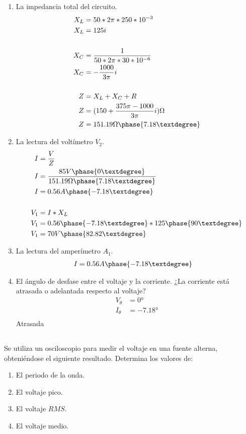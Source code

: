 \documentclass[../main.tex]{subfiles}
\begin{document}
\begin{enumerate}[label=\alph*)]
	\item La impedancia total del circuito.
		\begin{align*}
			X_L &= 50*2\pi*250*10^{-3}\\
			X_L &= 125i\\
			\\
			X_C &= \frac{1}{50*2\pi*30*10^{-6}}\\
			X_C &= -\frac{1000}{3\pi}i\\
			\\
			Z &= X_L+X_C+R\\
			Z &= (150 +\frac{375\pi-1000}{3\pi} i)\Omega\\
			Z &= 151.19\Omega\phase{7.18°}
		\end{align*}
	\item La lectura del voltímetro $V_2$.
		\begin{align*}
			I &= \frac{V}{Z}\\
			I &= \frac{85V\phase{0°}}{151.19\Omega\phase{7.18°}}\\
			I &= 0.56A\phase{-7.18°}\\
			\\
			V_1 &= I*X_L\\
			V_1 &= 0.56\phase{-7.18°}*125\phase{90°}\\
			V_1 &= 70V\phase{82.82°}
		\end{align*}
	\item La lectura del amperímetro $A_1$.
		\begin{align*}
			I &= 0.56A\phase{-7.18°}
		\end{align*}
	\item El ángulo de desfase entre el voltaje y la corriente.
		¿La corriente está atrasada o adelantada respecto al voltaje?
		\begin{align*}
			V_\theta &= 0°\\
			I_\theta &= -7.18°\\
		\end{align*}
		Atrasada
\end{enumerate}

\subsection{}%

Se utiliza un osciloscopio para medir el voltaje en una fuente alterna,
obteniéndose el siguiente resultado.
Determina los valores de:

\begin{enumerate}[label=\alph*)]
	\item El periodo de la onda.
	\item El voltaje pico.
	\item El voltaje $RMS$.
	\item El voltaje medio.
\end{enumerate}
\end{document}
